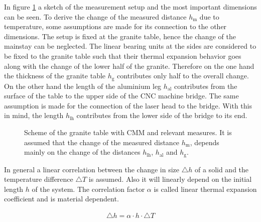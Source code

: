 \documentclass[
a4paper,                                %
twoside,                                %
BCOR1.4cm,                      %
10pt,                           %
headings=normal,                %
headsepline,                    %
clearplainpage, %
final,                                  %
div=14,
parskip=full,
openright,
bibliography=toc
]{scrreprt}
\begin{document}
In figure \ref{graniteTableSketch} a sketch of the measurement setup and the most important dimensions can be seen. To derive the change of the measured distance $h_{\mathrm{m}}$ due to temperature, some assumptions are made for its connection to the other dimensions. The setup is fixed at the granite table, hence the change of the mainstay can be neglected. The linear bearing units at the sides are considered to be fixed to the granite table such that their thermal expansion behavior goes along with the change of the lower half of the granite. Therefore on the one hand the thickness of the granite table $h_{\mathrm{g}}$ contributes only half to the overall change. On the other hand the length of the aluminium leg $h_{\mathrm{al}}$ contributes from the surface of the table to the upper side of the CNC machine bridge. The same assumption is made for the connection of the laser head to the bridge. With this in mind, the length $h_{\mathrm{lh}}$ contributes from the lower side of the bridge to its end. 

\begin{figure}[H]
	\centering
	\qquad
	\caption{Scheme of the granite table with CMM and relevant measures. It is assumed that the change of the measured distance $h_{\mathrm{m}}$, depends mainly on the change of the distances $h_{\mathrm{lh}}$, $h_{\mathrm{al}}$ and $h_{\mathrm{g}}$.}
	\label{graniteTableSketch}
\end{figure}

In general a linear correlation between the change in size $\bigtriangleup\!h$ of a solid and the temperature difference $\bigtriangleup\!T$ is assumed. Also it will linearly depend on the initial length $h$ of the system. The correlation factor $\alpha$ is called linear thermal expansion coefficient and is material dependent.

\begin{align}
	\bigtriangleup\!h = \alpha \cdot h \cdot \bigtriangleup\!T
	\label{gentempchange}
\end{align}
\end{document}

